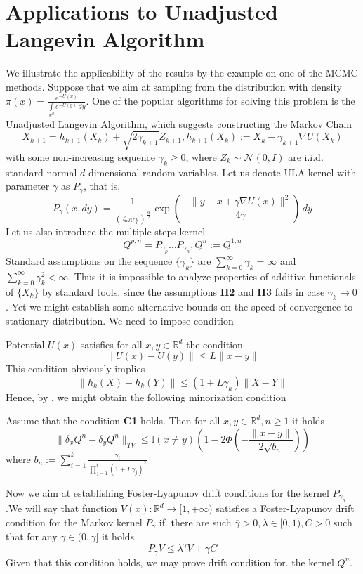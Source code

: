 \documentclass[leqno,11pt,a4paper]{article}
\begin{document}
\section{Applications to Unadjusted Langevin Algorithm}\label{sec:ULA}
We illustrate the applicability of the results by the example on one of the MCMC methods. Suppose that we aim at sampling from the distribution with density $\pi(x) = \frac{e^{-U(x)}}{\int\limits_{\mathbb{R}^d} e^{-U(y)}\,dy}$. One of the popular algorithms for solving this problem is the Unadjusted Langevin Algorithm, which suggests constructing the Markov Chain
$$
X_{k+1} = h_{k+1}(X_k) + \sqrt{2\gamma_{k+1}}Z_{k+1}, h_{k+1}(X_k) := X_{k} - \gamma_{k+1}\nabla U(X_{k}) 
$$
with some non-increasing sequence $\gamma_k \geq 0$, where $Z_k \sim \mathcal{N}(0,I)$ are i.i.d. standard normal $d$-dimensional random variables. Let us denote ULA kernel with parameter $\gamma$ as $P_{\gamma}$, that is,
\begin{equation}
\label{eq:ula_kernel}
P_{\gamma}(x,dy) = \frac{1}{(4\pi\gamma)^{\frac{d}{2}}}\exp{\left(-\frac{\|y-x+\gamma\nabla U(x)\|^2}{4\gamma}\right)}\,dy
\end{equation}
Let us also introduce the multiple steps kernel
$$
Q^{p,n} = P_{\gamma_p}\ldots P_{\gamma_n}, Q^{n} := Q^{1,n}
$$
Standard assumptions on the sequence $\{\gamma_k\}$ are $\sum\limits_{k=0}^{\infty}\gamma_k = \infty$ and $\sum\limits_{k=0}^{\infty}\gamma_k^2 < \infty$. Thus it is impossible to analyze properties of additive functionals of $\{X_k\}$ by standard tools, since the assumptions {\bf H2} and {\bf H3} fails in case $\gamma_k \rightarrow 0$.  Yet we might establish some alternative bounds on the speed of convergence to stationary distribution. We need to impose condition
\par
[{\bf C1}] Potential $U(x)$ satisfies for all $x,y \in \mathbb{R}^d$ the condition
$$
\|U(x) - U(y)\| \leq L\|x-y\|
$$
This condition obviously implies
$$
\|h_{k}(X) - h_k(Y)\| \leq (1+L\gamma_k)\|X-Y\|
$$
Hence, by \cite[Theorem~19]{durmus:moulines:2018}, we might obtain the following minorization condition
\begin{lemma} Assume that the condition {\bf C1} holds. Then for all $x,y \in \mathbb{R}^d, n\geq 1$ it holds
$$
\|\delta_xQ^n - \delta_yQ^n\|_{TV} \leq \mathbb{I}(x \neq y)\left(1 - 2\Phi\left(-\frac{\|x-y\|}{2\sqrt{b_n}}\right)\right)
$$
where $b_n := \sum\nolimits_{i=1}^{k}\frac{\gamma_i}{\prod_{j=1}^{i}(1+L\gamma_j)^2}$
\end{lemma}
Now we aim at establishing Foster-Lyapunov drift conditions for the kernel $P_{\gamma_n}$.We will say that function $V(x): \mathbb{R}^d \rightarrow [1,+\infty)$ satisfies a Foster-Lyapunov drift condition for the Markov kernel $P_\gamma$ if. there are such $\overline{\gamma} > 0, \lambda \in [0,1), C > 0$ such that for any $\gamma \in (0, \overline{\gamma}]$ it holds
\begin{equation}
\label{eq:drift}
P_{\gamma}V \leq \lambda^{\gamma}V + \gamma C
\end{equation}
Given that this condition holds, we may prove drift condition for. the kernel $Q^n$.
\end{document}
